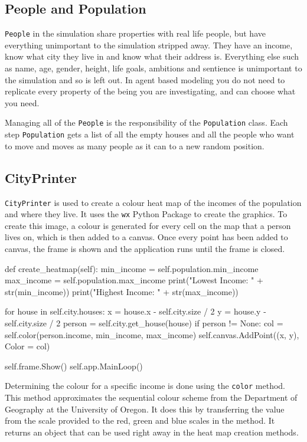 \subsection{People and Population}

\par
\texttt{People} in the simulation share properties with real life people, but have everything unimportant to the simulation stripped away. They have an income, know what city they live in and know what their address is. Everything else such as name, age, gender, height, life goals, ambitions and sentience is unimportant to the simulation and so is left out. In agent based modeling you do not need to replicate every property of the being you are investigating, and can choose what you need.

Managing all of the \texttt{People} is the responsibility of the \texttt{Population} class. Each step \texttt{Population} gets a list of all the empty houses and all the people who want to move and moves as many people as it can to a new random position.

\subsection{CityPrinter}

\texttt{CityPrinter} is used to create a colour heat map of the incomes of the population and where they live. It uses the \texttt{wx} Python Package to create the graphics. To create this image, a colour is generated for every cell on the map that a person lives on, which is then added to a canvas. Once every point has been added to canvas, the frame is shown and the application runs until the frame is closed.

\begin{code}[language=Python]
def create_heatmap(self):
	min_income = self.population.min_income
	max_income = self.population.max_income
	print("Lowest Income: " + str(min_income))
	print("Highest Income: " + str(max_income))
	
	for house in self.city.houses:
	    x = house.x - self.city.size / 2
	    y = house.y - self.city.size / 2
	    person = self.city.get_house(house)
	    if person != None:
	        col = self.color(person.income, min_income, max_income)
	        self.canvas.AddPoint((x, y), Color = col)
	
	self.frame.Show()
	self.app.MainLoop()
\end{code}

\par
Determining the colour for a specific income is done using the \texttt{color} method. This method approximates the sequential colour scheme from the Department of Geography at the University of Oregon\cite{dog-uoo}. It does this by transferring the value from the scale provided to the red, green and blue scales in the method. It returns an object that can be used right away in the heat map creation methods.

